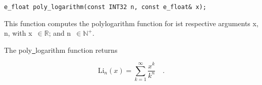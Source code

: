 \begin{lstlisting}
e_float poly_logarithm(const INT32 n, const e_float& x);
\end{lstlisting}

 This function computes the poly\-logarithm function
for ist respective arguments
{\courier x}, {\courier n},
with {\courier x}~$\in\mathbb{R}$; and {\courier n}~$\in\mathbb{N}^{+}$.

\vspace{6.0pt}

 The {\courier poly\underline\ logarithm} function
returns~\cite{wolframfunctions:website}

\begin{equation}
\text{Li}_{n}(x) = \sum_{k=1}^{\infty} \frac{x^{k}}{k^{n}}\quad .
\end{equation}

